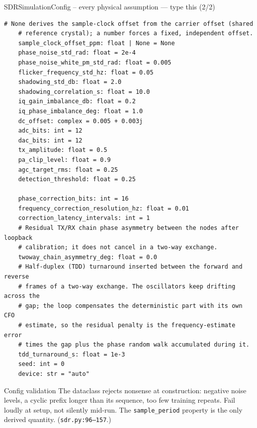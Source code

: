 \documentclass[10pt]{beamer}
\begin{document}
\begin{frame}[fragile]{SDRSimulationConfig -- every physical assumption --- type this (2/2)}
\begin{lstlisting}[basicstyle=\ttfamily\tiny]
    # None derives the sample-clock offset from the carrier offset (shared
    # reference crystal); a number forces a fixed, independent offset.
    sample_clock_offset_ppm: float | None = None
    phase_noise_std_rad: float = 2e-4
    phase_noise_white_pm_std_rad: float = 0.005
    flicker_frequency_std_hz: float = 0.05
    shadowing_std_db: float = 2.0
    shadowing_correlation_s: float = 10.0
    iq_gain_imbalance_db: float = 0.2
    iq_phase_imbalance_deg: float = 1.0
    dc_offset: complex = 0.005 + 0.003j
    adc_bits: int = 12
    dac_bits: int = 12
    tx_amplitude: float = 0.5
    pa_clip_level: float = 0.9
    agc_target_rms: float = 0.25
    detection_threshold: float = 0.25

    phase_correction_bits: int = 16
    frequency_correction_resolution_hz: float = 0.01
    correction_latency_intervals: int = 1
    # Residual TX/RX chain phase asymmetry between the nodes after loopback
    # calibration; it does not cancel in a two-way exchange.
    twoway_chain_asymmetry_deg: float = 0.0
    # Half-duplex (TDD) turnaround inserted between the forward and reverse
    # frames of a two-way exchange. The oscillators keep drifting across the
    # gap; the loop compensates the deterministic part with its own CFO
    # estimate, so the residual penalty is the frequency-estimate error
    # times the gap plus the phase random walk accumulated during it.
    tdd_turnaround_s: float = 1e-3
    seed: int = 0
    device: str = "auto"
\end{lstlisting}
\end{frame}

\begin{frame}{Config validation}
  The dataclass rejects nonsense at construction: negative
  noise levels, a cyclic prefix longer than its sequence, too
  few training repeats. Fail loudly at setup, not silently
  mid-run. The \texttt{sample\_period} property is the only
  derived quantity. (\texttt{sdr.py:96--157}.)
\end{frame}
\end{document}
